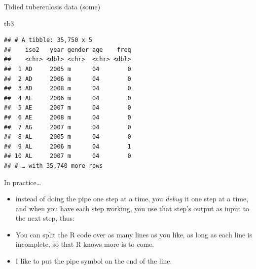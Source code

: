 \documentclass[ignorenonframetext,]{beamer}
\newenvironment{Shaded}{\begin{snugshade}}{\end{snugshade}}
\newcommand{\DataTypeTok}[1]{\textcolor[rgb]{0.13,0.29,0.53}{#1}}
\newcommand{\DecValTok}[1]{\textcolor[rgb]{0.00,0.00,0.81}{#1}}
\newcommand{\KeywordTok}[1]{\textcolor[rgb]{0.13,0.29,0.53}{\textbf{#1}}}
\newcommand{\NormalTok}[1]{#1}
\newcommand{\OperatorTok}[1]{\textcolor[rgb]{0.81,0.36,0.00}{\textbf{#1}}}
\newcommand{\StringTok}[1]{\textcolor[rgb]{0.31,0.60,0.02}{#1}}
\providecommand{\tightlist}{%
  \setlength{\itemsep}{0pt}\setlength{\parskip}{0pt}}
\begin{document}
\begin{frame}[fragile]{Tidied tuberculosis data (some)}
\protect\hypertarget{tidied-tuberculosis-data-some}{}

\begin{Shaded}
\begin{Highlighting}[]
\NormalTok{tb3}
\end{Highlighting}
\end{Shaded}

\begin{verbatim}
## # A tibble: 35,750 x 5
##    iso2   year gender age    freq
##    <chr> <dbl> <chr>  <chr> <dbl>
##  1 AD     2005 m      04        0
##  2 AD     2006 m      04        0
##  3 AD     2008 m      04        0
##  4 AE     2006 m      04        0
##  5 AE     2007 m      04        0
##  6 AE     2008 m      04        0
##  7 AG     2007 m      04        0
##  8 AL     2005 m      04        0
##  9 AL     2006 m      04        1
## 10 AL     2007 m      04        0
## # … with 35,740 more rows
\end{verbatim}

\end{frame}

\begin{frame}[fragile]{In practice\ldots{}}
\protect\hypertarget{in-practice}{}

\begin{itemize}
\tightlist
\item
  instead of doing the pipe one step at a time, you \emph{debug} it one
  step at a time, and when you have each step working, you use that
  step's output as input to the next step, thus:
\end{itemize}

\begin{Shaded}
\end{Shaded}

\begin{itemize}
\tightlist
\item
  You can split the R code over as many lines as you like, as long as
  each line is incomplete, so that R knows more is to come.
\item
  I like to put the pipe symbol on the end of the line.
\end{itemize}

\end{frame}
\end{document}
